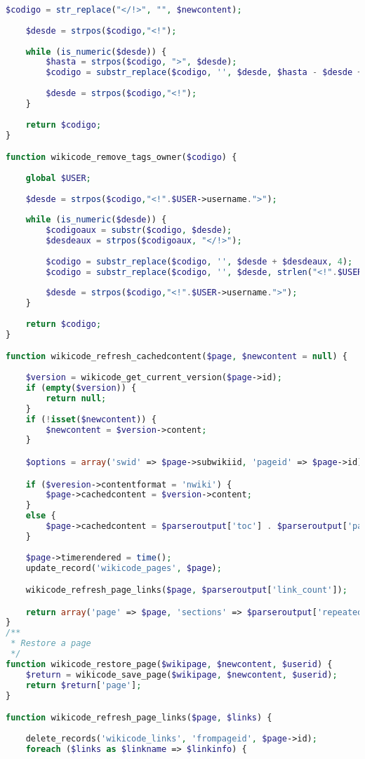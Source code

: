 \begin{lstlisting}[language=PHP]
	$codigo = str_replace("</!>", "", $newcontent);
	
	$desde = strpos($codigo,"<!");
	
	while (is_numeric($desde)) {
		$hasta = strpos($codigo, ">", $desde);
		$codigo = substr_replace($codigo, '', $desde, $hasta - $desde + 1);
		
		$desde = strpos($codigo,"<!");
	}
	
	return $codigo;
}

function wikicode_remove_tags_owner($codigo) {
	
	global $USER;
	
	$desde = strpos($codigo,"<!".$USER->username.">");
	
	while (is_numeric($desde)) {
		$codigoaux = substr($codigo, $desde);
		$desdeaux = strpos($codigoaux, "</!>");
		
		$codigo = substr_replace($codigo, '', $desde + $desdeaux, 4);
		$codigo = substr_replace($codigo, '', $desde, strlen("<!".$USER->username.">"));
		
		$desde = strpos($codigo,"<!".$USER->username.">");
	}
	
	return $codigo;
}

function wikicode_refresh_cachedcontent($page, $newcontent = null) {
    
    $version = wikicode_get_current_version($page->id);
    if (empty($version)) {
        return null;
    }
    if (!isset($newcontent)) {
        $newcontent = $version->content;
    }

    $options = array('swid' => $page->subwikiid, 'pageid' => $page->id);

	if ($veresion->contentformat = 'nwiki') {
		$page->cachedcontent = $version->content;
	}
	else {
		$page->cachedcontent = $parseroutput['toc'] . $parseroutput['parsed_text'];
	}
    
    $page->timerendered = time();
    update_record('wikicode_pages', $page);

    wikicode_refresh_page_links($page, $parseroutput['link_count']);

    return array('page' => $page, 'sections' => $parseroutput['repeated_sections'], 'version' => $version->version);
}
/**
 * Restore a page
 */
function wikicode_restore_page($wikipage, $newcontent, $userid) {
    $return = wikicode_save_page($wikipage, $newcontent, $userid);
    return $return['page'];
}

function wikicode_refresh_page_links($page, $links) {
    
    delete_records('wikicode_links', 'frompageid', $page->id);
    foreach ($links as $linkname => $linkinfo) {


\end{lstlisting}
